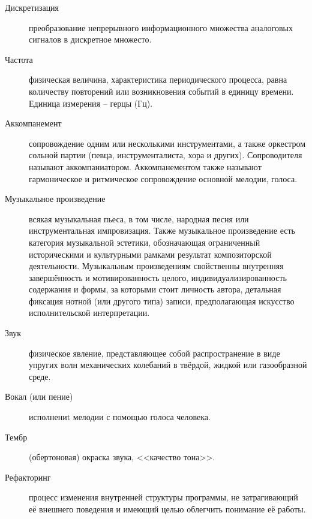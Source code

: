 \Defines %
\begin{description}
\item[Дискретизация] преобразование непрерывного информационного множества аналоговых сигналов в дискретное множесто.
\item[Частота] физическая величина, характеристика периодического процесса, равна количеству повторений или возникновения событий в единицу времени. Единица измерения -- герцы (Гц).
\item[Аккомпанемент] сопровождение одним или несколькими инструментами, а также оркестром сольной партии (певца, инструменталиста, хора и других). Сопроводителя называют аккомпаниатором. Аккомпанементом также называют гармоническое и ритмическое сопровождение основной мелодии, голоса.
\item[Музыкальное произведение] всякая музыкальная пьеса, в том числе, народная песня или инструментальная импровизация. Также музыкальное произведение есть категория музыкальной эстетики, обозначающая ограниченный историческими и культурными рамками результат композиторской деятельности. Музыкальным произведениям свойственны внутренняя завершённость и мотивированность целого, индивидуализированность содержания и формы, за которыми стоит личность автора, детальная фиксация нотной (или другого типа) записи, предполагающая искусство исполнительской интерпретации.
\item[Звук] физическое явление, представляющее собой распространение в виде упругих волн механических колебаний в твёрдой, жидкой или газообразной среде.
\item[Вокал (или пение)] исполнениt мелодии с помощью голоса человека.
\item[Тембр] (обертоновая) окраска звука, <<качество тона>>.
\item[Рефакторинг] процесс изменения внутренней структуры программы, не затрагивающий её внешнего поведения и имеющий целью облегчить понимание её работы.
\end{description}

